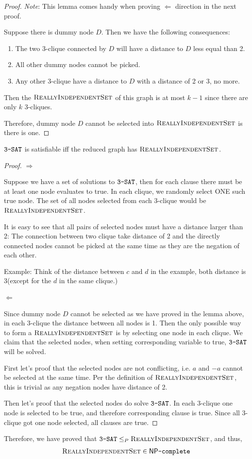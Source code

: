 \begin{proof}
    \textit{Note}: This lemma comes handy when proving $\Leftarrow$ direction in the next proof. 

    Suppose there is dummy node $D$. 
    Then we have the following consequences:
    \begin{enumerate}
        \item The two 3-clique connected by $D$ will have a distance to $D$ less equal than 2. 
        \item All other dummy nodes cannot be picked.
        \item Any other 3-clique have a distance to $D$ with a distance of 2 or 3, no more.
    \end{enumerate}
    
    Then the $\textsc{ReallyIndependentSet}$ of this graph is at most $k-1$ since there are only $k$ 3-cliques.

    Therefore, dummy node $D$ cannot be selected into $\textsc{ReallyIndependentSet}$ is there is one.
\end{proof}

\begin{theorem}
    $\texttt{3-SAT}$ is satisfiable iff the reduced graph has $\textsc{ReallyIndependentSet}$.
\end{theorem}

\begin{proof}
    $\Rightarrow$
    
    Suppose we have a set of solutions to $\texttt{3-SAT}$, then for each clause there must be at least one node evaluates to true.
    In each clique, we randomly select ONE such true node. The set of all nodes selected from each 3-clique would be $\textsc{ReallyIndependentSet}$.

    It is easy to see that all pairs of selected nodes must have a distance larger than 2: The connection between two clique take distance of 2 and the directly connected nodes cannot be picked at the same time as they are the negation of each other.

    Example: Think of the distance between $c$ and $d$ in the example, both distance is 3(except for the $d$ in the same clique.)

    $\Leftarrow$

    Since dummy node $D$ cannot be selected as we have proved in the lemma above, in each 3-clique the distance between all nodes is 1. 
    Then the only possible way to form a $\textsc{ReallyIndependentSet}$ is by selecting one node in each clique.
    We claim that the selected nodes, when setting corresponding variable to true, $\texttt{3-SAT}$ will be solved.

    First let's proof that the selected nodes are not conflicting, i.e. $a$ and $-a$ cannot be selected at the same time.
    Per the definition of $\textsc{ReallyIndependentSet}$, this is trivial as any negation nodes have distance of 2.

    Then let's proof that the selected nodes do solve $\texttt{3-SAT}$.
    In each 3-clique one node is selected to be true, and therefore corresponding clause is true. 
    Since all 3-clique got one node selected, all clauses are true.
\end{proof}

Therefore, we have proved  that $\texttt{3-SAT} \le_P \textsc{ReallyIndependentSet}$, and thus, $$\textsc{ReallyIndependentSet} \in \mathsf{NP}\texttt{-complete}$$


